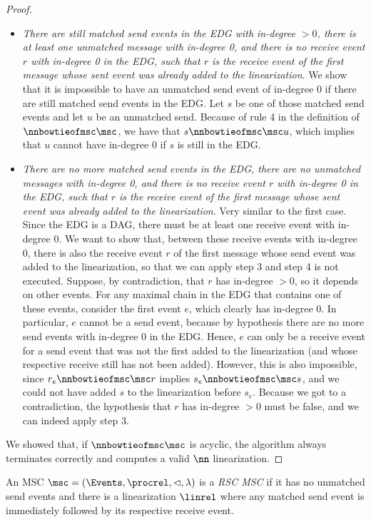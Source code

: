 \begin{proof}
\begin{itemize}
	\item \emph{There are still matched send events in the EDG with in-degree $>0$, there is at least one unmatched message with in-degree 0, and there is no receive event $r$ with in-degree 0 in the EDG, such that $r$ is the receive event of the first message whose sent event was already added to the linearization}. We show that it is impossible to have an unmatched send event of in-degree 0 if there are still matched send events in the EDG. Let $s$ be one of those matched send events and let $u$ be an unmatched send. Because of rule 4 in the definition of $\nnbowtieofmsc\msc$, we have that $s \nnbowtieofmsc\msc u$, which implies that $u$ cannot have in-degree 0 if $s$ is still in the EDG.
	\item \emph{There are no more matched send events in the EDG, there are no unmatched messages with in-degree 0, and there is no receive event $r$ with in-degree 0 in the EDG, such that $r$ is the receive event of the first message whose sent event was already added to the linearization}. Very similar to the first case. Since the EDG is a DAG, there must be at least one receive event with in-degree 0. We want to show that, between these receive events with in-degree 0, there is also the receive event $r$ of the first message whose send event was added to the linearization, so that we can apply step 3 and step 4 is not executed. Suppose, by contradiction, that $r$ has in-degree $>0$, so it depends on other events. For any maximal chain in the EDG that contains one of these events, consider the first event $e$, which clearly has in-degree 0. In particular, $e$ cannot be a send event, because by hypothesis there are no more send events with in-degree 0 in the EDG. Hence, $e$ can only be a receive event for a send event that was not the first added to the linearization (and whose respective receive still has not been added). However, this is also impossible, since $r_e \nnbowtieofmsc\msc r$ implies $s_e \nnbowtieofmsc\msc s$, and we could not have added $s$ to the linearization before $s_e$. Because we got to a contradiction, the hypothesis that $r$ has in-degree $>0$ must be false, and we can indeed apply step 3.
\end{itemize}
We showed that, if $\nnbowtieofmsc\msc$ is acyclic, the algorithm always terminates correctly and computes a valid $\nn$ linearization.
\end{proof}

\begin{definition}%
	An MSC $\msc = (\Events,\procrel,\lhd,\lambda)$ is a \emph{RSC MSC} if it has no unmatched send events and there is a linearization $\linrel$ where any matched send event is immediately followed by its respective receive event.
\end{definition}

